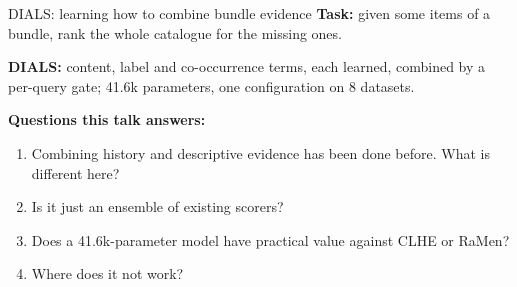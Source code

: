 \documentclass[10pt,aspectratio=169]{beamer}
\newcommand{\key}[1]{\textcolor{Accent}{\textbf{#1}}}
\begin{document}
\begin{frame}{DIALS: learning how to combine bundle evidence}
\vspace{3mm}
\key{Task:} given some items of a bundle, rank the whole catalogue for the missing ones.\par
\vspace{4mm}
\key{DIALS:} content, label and co-occurrence terms, each learned, combined by a per-query gate; 41.6k parameters, one configuration on 8 datasets.\par
\vspace{5mm}
\key{Questions this talk answers:}
\begin{enumerate}\setlength\itemsep{4pt}
\item Combining history and descriptive evidence has been done before. What is different here?
\item Is it just an ensemble of existing scorers?
\item Does a 41.6k-parameter model have practical value against CLHE or RaMen?
\item Where does it not work?
\end{enumerate}
\end{frame}
\end{document}
